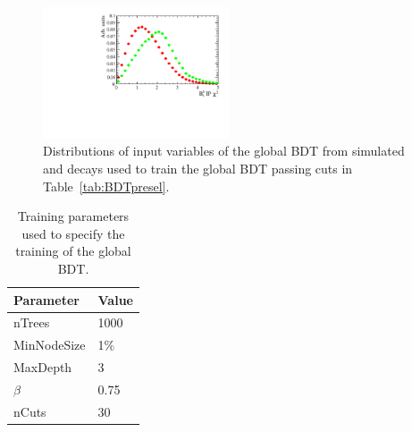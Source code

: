 \begin{figure}[htbp]
 \includegraphics[width=0.49\textwidth]{./Figs/Selection/var5_sim_all.pdf}

    \caption{Distributions of input variables of the global BDT from simulated \bsmumu and \bbbarmumux decays used to train the global BDT passing cuts in Table~\ref{tab:BDTpresel}.}
    \label{fig:BDTvars}
\end{figure}


\begin{table}[htbp]
\begin{center}
\begin{tabular}{ll}
\hline
Parameter & Value \\ \hline
nTrees & 1000 \\
MinNodeSize & 1$\%$ \\
MaxDepth & 3 \\
$\beta$ & 0.75 \\
nCuts & 30 \\
\hline
\end{tabular}
\vspace{0.7cm}
\caption{Training parameters used to specify the training of the global BDT.}
\label{tab:BDTtrainingparams}
\end{center}
\vspace{-1.0cm}
\end{table}




